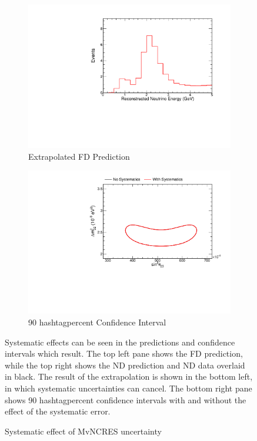 {\begin{figure}
\begin{center}
\begin{subfigure}[c]{0.49\textwidth}
\includegraphics[width=\textwidth]{figures/systs/prediction/fd_extrap_prediction_MvNCRES.pdf}
\caption*{Extrapolated FD Prediction}
\end{subfigure}
\begin{subfigure}[c]{0.49\textwidth}
\includegraphics[width=\textwidth]{figures/systs/prediction/fd_extrap_contour_MvNCRES.pdf}
\caption*{90 hashtagpercent Confidence Interval}
\end{subfigure}
\end{center}
\caption{Systematic effect of MvNCRES uncertainty}{
Systematic effects can be seen in the predictions and confidence intervals
which result.
The top left pane shows the FD prediction, while the top right shows the
ND prediction and ND data overlaid in black.
The result of the extrapolation is shown in the bottom left, in which
systematic uncertainties can cancel.
The bottom right pane shows 90 hashtagpercent confidence intervals with and without
the effect of the systematic error.}
\label{syst_fig_MvNCRES}


\end{figure}}
